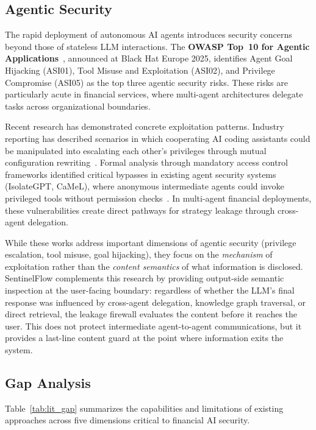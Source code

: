 \documentclass[journal]{IEEEtran}
\begin{document}
\subsection{Agentic Security}
\label{Sect:LR_Agentic}

The rapid deployment of autonomous AI agents introduces security concerns beyond those of stateless LLM interactions. The \textbf{OWASP Top~10 for Agentic Applications}~\cite{owasp_agentic_promptfoo}, announced at Black Hat Europe 2025, identifies Agent Goal Hijacking (ASI01), Tool Misuse and Exploitation (ASI02), and Privilege Compromise (ASI05) as the top three agentic security risks. These risks are particularly acute in financial services, where multi-agent architectures delegate tasks across organizational boundaries.

Recent research has demonstrated concrete exploitation patterns. Industry reporting has described scenarios in which cooperating AI coding assistants could be manipulated into escalating each other's privileges through mutual configuration rewriting~\cite{sombra_llm_security_2026}. Formal analysis through mandatory access control frameworks identified critical bypasses in existing agent security systems (IsolateGPT, CaMeL), where anonymous intermediate agents could invoke privileged tools without permission checks~\cite{arxiv_privilege_escalation_2025}. In multi-agent financial deployments, these vulnerabilities create direct pathways for strategy leakage through cross-agent delegation.

While these works address important dimensions of agentic security (privilege escalation, tool misuse, goal hijacking), they focus on the \textit{mechanism} of exploitation rather than the \textit{content semantics} of what information is disclosed. SentinelFlow complements this research by providing output-side semantic inspection at the user-facing boundary: regardless of whether the LLM's final response was influenced by cross-agent delegation, knowledge graph traversal, or direct retrieval, the leakage firewall evaluates the content before it reaches the user. This does not protect intermediate agent-to-agent communications, but it provides a last-line content guard at the point where information exits the system.

\subsection{Gap Analysis}
\label{Sect:LR_Gap}

Table~\ref{tab:lit_gap} summarizes the capabilities and limitations of existing approaches across five dimensions critical to financial AI security.
\end{document}
